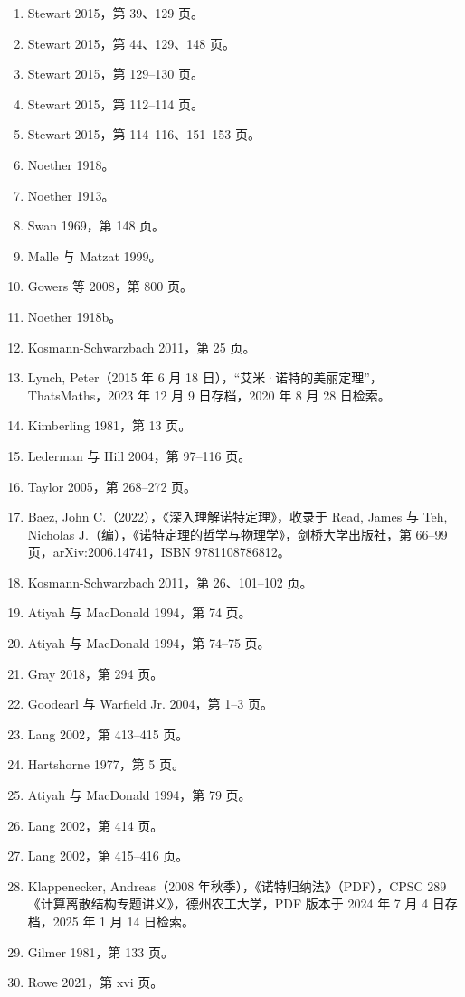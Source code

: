 \begin{enumerate}
\item Stewart 2015，第 39、129 页。
\item Stewart 2015，第 44、129、148 页。
\item Stewart 2015，第 129–130 页。
\item Stewart 2015，第 112–114 页。
\item Stewart 2015，第 114–116、151–153 页。
\item Noether 1918。
\item Noether 1913。
\item Swan 1969，第 148 页。
\item Malle 与 Matzat 1999。
\item Gowers 等 2008，第 800 页。
\item Noether 1918b。
\item Kosmann-Schwarzbach 2011，第 25 页。
\item Lynch, Peter（2015 年 6 月 18 日），“艾米·诺特的美丽定理”，ThatsMaths，2023 年 12 月 9 日存档，2020 年 8 月 28 日检索。
\item Kimberling 1981，第 13 页。
\item Lederman 与 Hill 2004，第 97–116 页。
\item Taylor 2005，第 268–272 页。
\item Baez, John C.（2022），《深入理解诺特定理》，收录于 Read, James 与 Teh, Nicholas J.（编），《诺特定理的哲学与物理学》，剑桥大学出版社，第 66–99 页，arXiv:2006.14741，ISBN 9781108786812。
\item Kosmann-Schwarzbach 2011，第 26、101–102 页。
\item Atiyah 与 MacDonald 1994，第 74 页。
\item Atiyah 与 MacDonald 1994，第 74–75 页。
\item Gray 2018，第 294 页。
\item Goodearl 与 Warfield Jr. 2004，第 1–3 页。
\item Lang 2002，第 413–415 页。
\item Hartshorne 1977，第 5 页。
\item Atiyah 与 MacDonald 1994，第 79 页。
\item Lang 2002，第 414 页。
\item Lang 2002，第 415–416 页。
\item Klappenecker, Andreas（2008 年秋季），《诺特归纳法》（PDF），CPSC 289《计算离散结构专题讲义》，德州农工大学，PDF 版本于 2024 年 7 月 4 日存档，2025 年 1 月 14 日检索。
\item Gilmer 1981，第 133 页。
\item Rowe 2021，第 xvi 页。

\end{enumerate}
